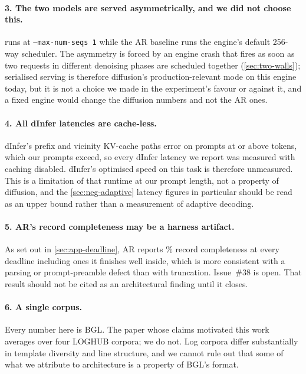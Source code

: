 \paragraph{3. The two models are served asymmetrically, and we did not choose
this.} \modelDG{} runs at \texttt{--max-num-seqs 1} while the AR baseline runs
the engine's default 256-way scheduler. The asymmetry is forced by an engine
crash that fires as soon as two requests in different denoising phases are
scheduled together (\cref{sec:two-walls}); serialised serving is therefore
diffusion's production-relevant mode on this engine today, but it is not a
choice we made in the experiment's favour or against it, and a fixed engine
would change the diffusion numbers and not the AR ones.

\paragraph{4. All dInfer latencies are cache-less.} dInfer's prefix and vicinity
KV-cache paths error on prompts at or above \dinferCachePromptLimit{} tokens,
which our prompts exceed, so every dInfer latency we report was measured with
caching disabled. dInfer's optimised speed on this task is therefore unmeasured.
This is a limitation of that runtime at our prompt length, not a property of
diffusion, and the \cref{sec:neg-adaptive} latency figures in particular should
be read as an upper bound rather than a measurement of adaptive decoding.

\paragraph{5. AR's record completeness may be a harness artifact.} As set out in
\cref{sec:app-deadline}, AR reports \arRecordComplete\% record completeness at
every deadline including ones it finishes well inside, which is more consistent
with a parsing or prompt-preamble defect than with truncation. Issue~\#38 is
open. That result should not be cited as an architectural finding until it
closes. 

\paragraph{6. A single corpus.} Every number here is BGL. The paper whose
claims motivated this work averages over four LOGHUB corpora; we do not. Log
corpora differ substantially in template diversity and line structure, and we
cannot rule out that some of what we attribute to architecture is a property of
BGL's format.

